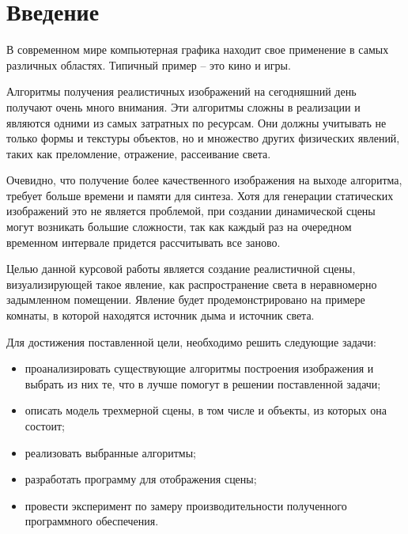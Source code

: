 \chapter*{Введение}

В современном мире компьютерная графика находит свое применение в самых различных областях. Типичный пример – это кино и игры.

Алгоритмы получения реалистичных изображений на сегодняшний день получают очень много внимания. Эти алгоритмы сложны в реализации и являются одними из самых затратных по ресурсам. Они должны учитывать не только формы и текстуры объектов, но и множество других физических явлений, таких как преломление, отражение, рассеивание света.
 
Очевидно, что получение более качественного изображения на выходе алгоритма, требует больше времени и памяти для синтеза. Хотя для генерации статических изображений это не является проблемой, при создании динамической сцены могут возникать большие сложности, так как каждый раз на очередном временном интервале придется рассчитывать все заново.

Целью данной курсовой работы является создание реалистичной сцены, визуализирующей такое явление, как распространение света в неравномерно задымленном помещении. Явление будет продемонстрировано на примере комнаты, в которой находятся источник дыма и источник света.

Для достижения поставленной цели, необходимо решить следующие задачи:
\begin{itemize}[label=---]
	\item проанализировать существующие алгоритмы построения изображения и выбрать из них те, что в лучше помогут в решении поставленной задачи;
	\item описать модель трехмерной сцены, в том числе и объекты, из которых она состоит;
	\item реализовать выбранные алгоритмы;
	\item разработать программу для отображения сцены;
	\item провести эксперимент по замеру производительности полученного программного обеспечения.
\end{itemize}

